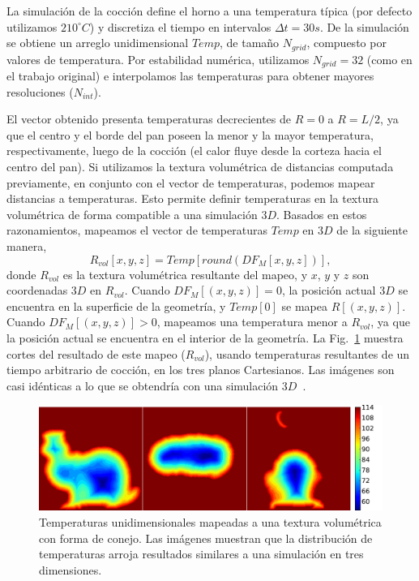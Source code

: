La simulación de la cocción define el horno a una temperatura típica (por defecto utilizamos $210^{\circ}C$) y discretiza el tiempo en intervalos $\Delta t = 30s$.
De la simulación se obtiene un arreglo unidimensional $Temp$, de tamaño $N_{grid}$, compuesto por valores de temperatura.
Por estabilidad numérica, utilizamos $N_{grid}=32$ (como en el trabajo original) e interpolamos las temperaturas para obtener mayores resoluciones ($N_{int}$). 

El vector obtenido presenta temperaturas decrecientes de $R = 0$ a $R = L/2$, ya que el centro y el borde del pan poseen la menor y la mayor temperatura, respectivamente, luego de la cocción (el calor fluye desde la corteza hacia el centro del pan). 
Si utilizamos la textura volumétrica de distancias computada previamente, en conjunto con el vector de temperaturas, podemos mapear distancias a temperaturas.
Esto permite definir temperaturas en la textura volumétrica de forma compatible a una simulación $3D$.
Basados en estos razonamientos, mapeamos el vector de temperaturas $Temp$ en $3D$ de la siguiente manera,
\begin{equation*}
\displaystyle R_{vol}[x,y,z] = Temp[ round( DF_{M}[x,y,z] ) ], 
\end{equation*}
%
\noindent donde $R_{vol}$ es la textura volumétrica resultante del mapeo, y $x$, $y$ y $z$ son coordenadas $3D$ en $R_{vol}$. Cuando $DF_{M}[(x,y,z)] = 0$, la posición actual $3D$ se encuentra en la superficie de la geometría, y $Temp[0]$ se mapea $R[(x,y,z)]$.
Cuando $DF_{M}[(x,y,z)] > 0$, mapeamos una temperatura menor a $R_{vol}$, ya que la posición actual se encuentra en el interior de la geometría.
La Fig.~\ref{fg:baking} muestra cortes del resultado de este mapeo ($R_{vol}$), usando temperaturas resultantes de un tiempo arbitrario de cocción, en los tres planos Cartesianos. 
Las imágenes son casi idénticas a lo que se obtendría con una simulación $3D$~\cite{Purlis2010}.

\begin{figure}
\includegraphics[width=12cm]{figures/tempsbunny}
\caption[Temperaturas unidimensionales mapeadas a una textura volumétrica con forma de conejo]{Temperaturas unidimensionales mapeadas a una textura volumétrica con forma de conejo. Las imágenes muestran que la distribución de temperaturas arroja resultados similares a una simulación en tres dimensiones.}
\label{fg:baking}
\end{figure}

